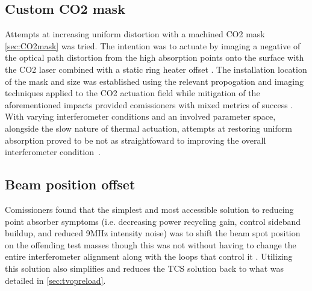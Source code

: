 \subsection{Custom CO2 mask}
Attempts at increasing uniform distortion with a machined CO2 mask \autoref{sec:CO2mask} was tried. The intention was to actuate by imaging a negative of the optical path distortion from the high absorption points onto the surface with the CO2 laser combined with a static ring heater offset \cite{elog:2019_02_17:brooks}. The installation location of the mask and size was established using the relevant propogation and imaging techniques applied to the CO2 actuation field while mitigation of the aforementioned impacts provided comissioners with mixed metrics of success \cite{elog:2019_03_28:mansell, elog:2019_02_22:brown}. With varying interferometer conditions and an involved parameter space, alongside the slow nature of thermal actuation, attempts at restoring uniform absorption proved to be not as straightfoward to improving the overall interferometer condition~\cite{brooks:aigwd2019, buikema:2020}. 



\subsection{Beam position offset}
Comissioners found that the simplest and most accessible solution to reducing point absorber symptoms (i.e. decreasing power recycling gain, control sideband buildup, and reduced 9MHz intensity noise) was to shift the beam spot position on the offending test masses \cite{elog:2019_02_23:driggers} though this was not without having to change the entire interferometer alignment along with the loops that control it \cite{elog:2019_02_25:driggers}. Utilizing this solution also simplifies and reduces the TCS solution back to what was detailed in \autoref{sec:tvopreload}.


